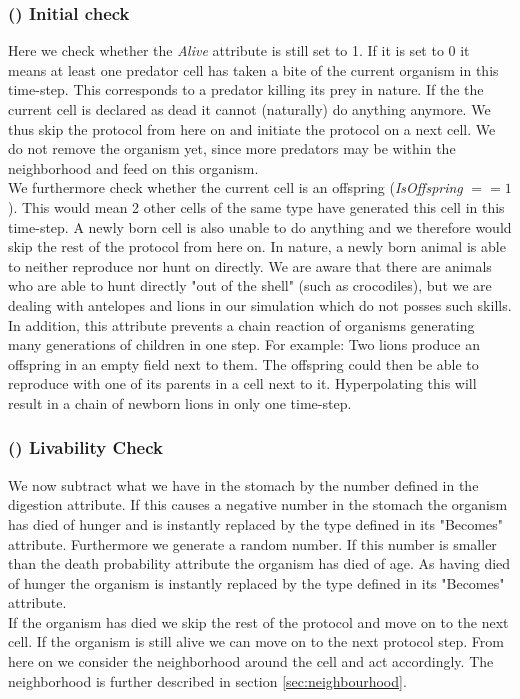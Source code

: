 \documentclass[11pt]{article}
\begin{document}
\subsubsection{() Initial check} 
Here we check whether the {\it Alive} attribute is still set to 1. If it is set to 0 it means at least one predator cell has taken a bite of the current organism in this time-step.  This corresponds to a predator killing its prey in nature. If the the current cell is declared as dead it cannot (naturally) do anything anymore. We thus skip the protocol from here on and initiate the protocol on a next cell. We do not remove the organism yet, since more predators may be within the neighborhood and feed on this organism.
\\We furthermore check whether the current cell is an offspring ({\it IsOffspring} $== 1$). This would mean 2 other cells of the same type have generated this cell in this time-step. A newly born cell is also unable to do anything and we therefore would skip the rest of the protocol from here on. In nature, a newly born animal is able to neither reproduce nor hunt on directly. We are aware that there are animals who are able to hunt directly "out of the shell" (such as crocodiles), but we are dealing with antelopes and lions in our simulation which do not posses such skills. In addition, this attribute prevents a chain reaction of organisms generating many generations of children in one step. For example: Two lions produce an offspring in an empty field next to them. The offspring could then be able to reproduce with one of its parents in a cell next to it. Hyperpolating this will result in a chain of newborn lions in only one time-step.

\addtocounter{protocolCounter}{1}
\subsubsection{() Livability Check} 
We now subtract what we have in the stomach by the number defined in the digestion attribute. If this causes a negative number in the stomach the organism has died of hunger and is instantly replaced by the type defined in its "Becomes" attribute. Furthermore we generate a random number. If this number is smaller than the death probability attribute the organism has died of age. As having died of hunger the organism is instantly replaced by the type defined in its "Becomes" attribute.\\
If the organism has died we skip the rest of the protocol and move on to the next cell. If the organism is still alive we can move on to the next protocol step. From here on we consider the neighborhood around the cell and act accordingly. The neighborhood is further described in section \ref{sec:neighbourhood}.
\addtocounter{protocolCounter}{1}
\end{document}
